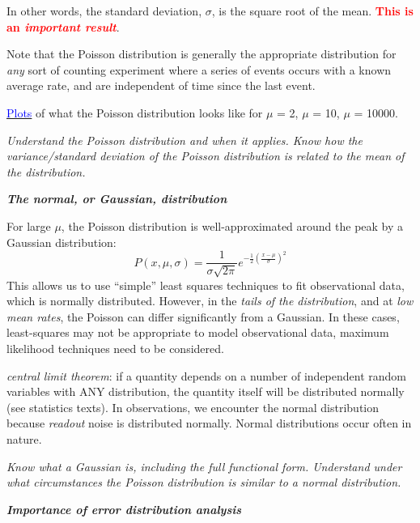 \documentclass[12pt]{article}
\begin{document}
In other words, the standard deviation, $\sigma$, is the square root
of the mean.
\textcolor{red}{\textbf{This is an \emph{important result}}}.

Note that the Poisson distribution is generally the
appropriate distribution for \emph{any} sort of counting experiment
where a series of events occurs with a known average rate,
and are independent of time since the last event.

\href{http://astronomy.nmsu.edu/holtz/a535/html/diagrams/a535/poisson.htm}
{\textcolor{blue}{Plots}} of what the Poisson distribution looks like
for $\mu$ = 2, $\mu$ = 10, $\mu$ = 10000.

\textcolor{om}{\emph{Understand the Poisson distribution and when it
applies. Know how the variance/standard deviation of the Poisson
distribution is related to the mean of the distribution.}}

\textbf{\emph{The normal, or Gaussian, distribution}}

For large $\mu$, the Poisson distribution is
well-approximated around the peak by a Gaussian distribution:
    $$ P(x,\mu,\sigma) = \frac{1}{\sigma\sqrt{2\pi}}
        e^{ -\frac{1}{2} (\frac{x-\mu}{\sigma})^{2} }  $$
This allows us to use ``simple'' least squares
techniques to fit observational data, which is normally distributed.
However, in the \emph{tails of the distribution},
and at \emph{low mean rates}, the Poisson can
differ significantly from a Gaussian. In these cases,
least-squares may not be appropriate to model observational data,
maximum likelihood techniques need to be considered.

\emph{central limit theorem}: if a quantity
depends on a number of independent random variables with ANY
distribution, the quantity itself will be distributed normally (see
statistics texts). In observations, we encounter the normal
distribution because \emph{readout} noise is distributed normally.
Normal distributions occur often in nature.

\textcolor{om}{\emph{Know what a Gaussian is, including the full
functional form. Understand under what circumstances the Poisson
distribution is similar to a normal distribution.}}

\textbf{\emph{Importance of error distribution analysis}}
\end{document}
